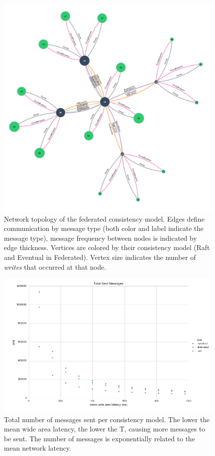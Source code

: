 \documentclass[11pt,letterpaper]{article}
\begin{document}
\begin{figure}[!h]
    \centering
        \includegraphics[width=\textwidth]{figures/federated-T1480.png}
        \caption{\textsf{Network topology of the federated consistency model. Edges define communication by message type (both color and label indicate the message type), message frequency between nodes is indicated by edge thickness. Vertices are colored by their consistency model (Raft and Eventual in Federated). Vertex size indicates the number of \textit{writes} that occurred at that node.}}
        \label{fig:topology}
\end{figure}

\begin{figure}[!h]
    \centering
        \includegraphics[width=\textwidth]{figures/messages_sent.png}
        \caption{\textsf{Total number of messages sent per consistency model. The lower the mean wide area latency, the lower the T, causing more messages to be sent. The number of messages is exponentially related to the mean network latency.}}
        \label{fig:messages_sent}
\end{figure}
\end{document}
